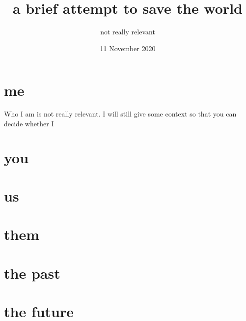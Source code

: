 \documentclass[a5paper]{book}
\title{a brief attempt to save the world}
\author{not really relevant}
\date{11 November 2020}
\begin{document}
\maketitle
\tableofcontents
\chapter{me}
Who I am is not really relevant.
I will still give some context so that you can decide whether I 
\chapter{you}
\chapter{us}
\chapter{them}
\chapter{the past}
\chapter{the future}
\end{document}
